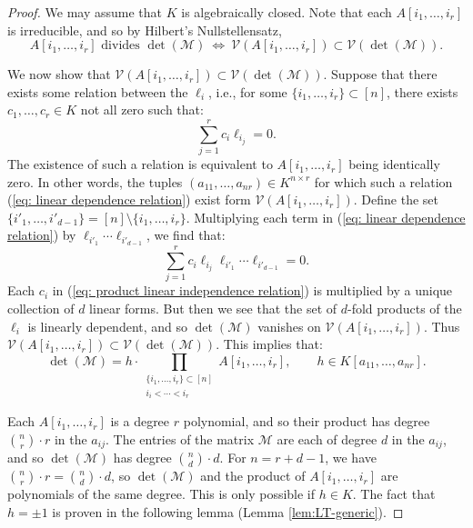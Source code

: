 \documentclass[10pt,a4paper]{amsart}
\newcommand{\calM}{\mathcal{M}}
\begin{document}
\begin{proof}
 We may assume that $K$ is algebraically closed. Note that each \(A[i_1,\ldots, i_r]\) is irreducible, and so by Hilbert's Nullstellensatz,
\[A[i_1,\ldots, i_r]\text{ divides } \det(\mathcal{M}) \ \Leftrightarrow \ \mathcal{V}(A[i_1,\ldots, i_r])\subset \mathcal{V}(\det(\mathcal{M})).\]

We now show that $\mathcal{V}(A[i_1,\ldots, i_r])\subset \mathcal{V}(\det(\mathcal{M}))$. Suppose that there exists some relation between the \(\ell_{i}\), i.e., for some \(\{i_1,\ldots,i_r\}\subset[n]\), there exists \(c_1,\ldots, c_r\in K\) not all zero such that:
\begin{equation}\label{eq: linear dependence relation}
\sum_{j=1}^{r}c_i\ell_{i_j}=0.
\end{equation}
The existence of such a relation is equivalent to \(A[i_1,\ldots, i_r]\) being identically zero. In other words, the tuples \((a_{11},\ldots,a_{nr})\in K^{n\times r}\) for which such a relation (\ref{eq: linear dependence relation}) exist form \(\mathcal{V}(A[i_1,\ldots, i_r])\).
Define the set \(\{i'_1,\ldots,i'_{d-1}\}=[n]\setminus\{i_1,\ldots,i_r\}\). Multiplying each term in (\ref{eq: linear dependence relation}) by \(\ell_{i'_1}\cdots\ell_{i'_{d-1}}\), we find that:
\begin{equation}\label{eq: product linear independence relation}
\sum_{j=1}^{r}c_i\ell_{i_j}\ell_{i'_1}\cdots\ell_{i'_{d-1}}=0.
\end{equation}
Each \(c_i\) in (\ref{eq: product linear independence relation}) is multiplied by a unique collection of \(d\) linear forms.
But then we see that the set of $d$-fold products of the $\ell_i$ is linearly dependent, and so $\det(\calM)$ vanishes on \(\mathcal{V}(A[i_1,\ldots, i_r])\). Thus \(\mathcal{V}(A[i_1,\ldots, i_r])\subset \mathcal{V}(\det(\mathcal{M}))\). This implies that:
\[\det(\mathcal{M})=h\cdot\prod_{\substack{\{i_1,\ldots, i_r\}\subset[n] \\ i_i<\cdots<i_r}}A[i_1,\ldots, i_r],\qquad h\in K[a_{11},\ldots,a_{nr}].\]

Each $A[i_1,\ldots, i_r]$ is a degree $r$ polynomial, and so their product has degree $\binom{n}{r}\cdot r$ in the $a_{ij}$.
The entries of the matrix \(\mathcal{M}\) are each of degree \(d\) in the \(a_{ij}\), and so \(\det(\mathcal{M})\) has degree \(\binom{n}{d}\cdot d\). For \(n=r+d-1\), we have \(\binom{n}{r}\cdot r=\binom{n}{d}\cdot d\), so \(\det(\mathcal{M})\) and the product of $A[i_1,\ldots, i_r]$ are polynomials of the same degree. This is only possible if \(h\in K\). The fact that $h=\pm 1$ is proven in the
following lemma (Lemma \ref{lem:LT-generic}).
\end{proof}
\end{document}
